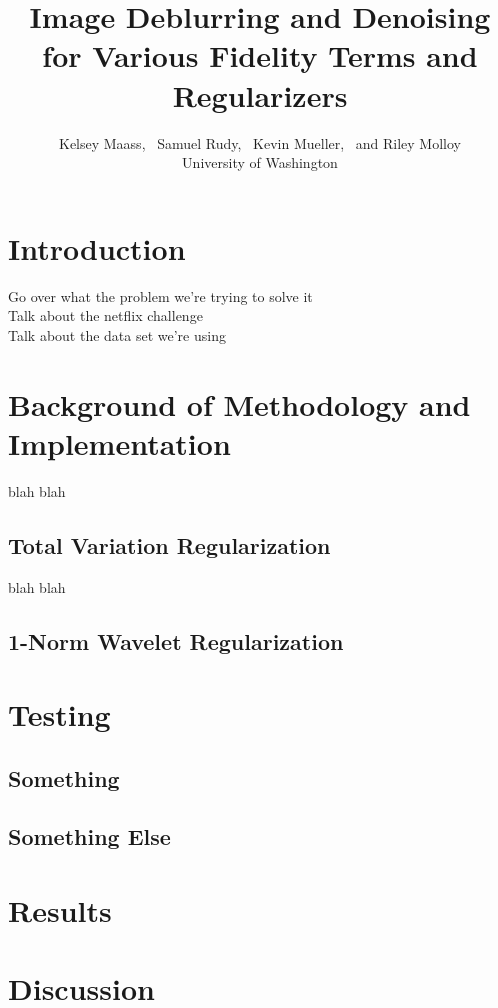 \documentclass[10pt,a4paper]{article}
\begin{document}
\title{Image Deblurring and Denoising for Various Fidelity Terms and Regularizers}
\author{
Kelsey Maass, ~Samuel Rudy, ~Kevin Mueller, ~and Riley Molloy\\
University of Washington\\
}

\maketitle

\section{Introduction}
Go over what the problem we're trying to solve it\\
Talk about the netflix challenge\\
Talk about the data set we're using

\section{Background of Methodology and Implementation}
blah blah 

\subsection{Total Variation Regularization}
blah blah

\subsection{1-Norm Wavelet Regularization}

\section{Testing}

\subsection{Something}


\subsection{Something Else}



\section{Results}

\section{Discussion}



\end{document}
